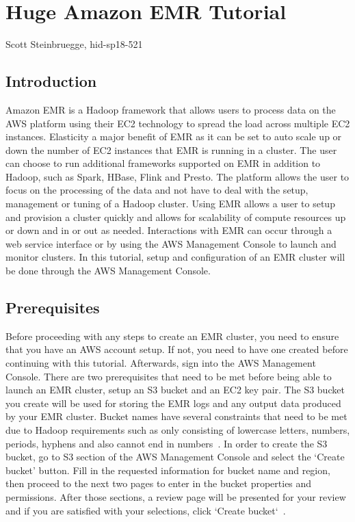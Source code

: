 \chapter{Huge Amazon EMR Tutorial}

Scott Steinbruegge, hid-sp18-521

\section{Introduction}

Amazon EMR is a Hadoop framework that allows users to process data on the AWS 
platform using their EC2 technology to spread the load across multiple EC2 
instances. Elasticity a major benefit of EMR as it can be set to auto scale 
up or down the number of EC2 instances that EMR is running in a cluster. The 
user can choose to run additional frameworks supported on EMR in addition 
to Hadoop, such as Spark, HBase, Flink and Presto. The platform allows the 
user to focus on the processing of the data and not have to deal with the 
setup, management or tuning of a Hadoop cluster. Using EMR allows a user 
to setup and provision a cluster quickly and allows for scalability of 
compute resources up or down and in or out as needed. Interactions with 
EMR can occur through a web service interface or by using the AWS 
Management Console to launch and monitor clusters. In this tutorial, 
setup and configuration of an EMR cluster will be done through the AWS 
Management Console. 

\section{Prerequisites}

Before proceeding with any steps to create an EMR cluster, you need to 
ensure that you have an AWS account setup. If not, you need to have one 
created before continuing with this tutorial. Afterwards, sign into the 
AWS Management Console. There are two prerequisites that need to be met 
before being able to launch an EMR cluster, setup an S3 bucket and an EC2 
key pair. The S3 bucket you create will be used for storing the EMR logs 
and any output data produced by your EMR cluster. Bucket names have several 
constraints that need to be met due to Hadoop requirements such as only 
consisting of lowercase letters, numbers, periods, hyphens and also cannot 
end in numbers~\cite{hid-sp18-521-prereq}. In order to create the S3 bucket, 
go to S3 section of the AWS Management Console and select the `Create bucket' 
button. Fill in the requested information for bucket name and region, then 
proceed to the next two pages to enter in the bucket properties and 
permissions. After those sections, a review page will be presented for your 
review and if you are satisfied with your selections, 
click `Create bucket`~\cite{hid-sp18-521-s3bucket}. 

